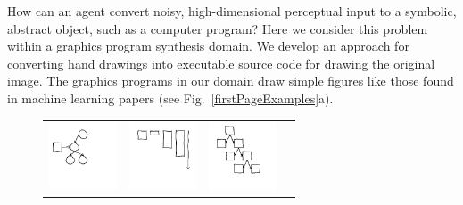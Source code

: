 \documentclass{article}
\newcommand{\exampleImageSize}{2cm}
\begin{document}
 How can an agent convert noisy, high-dimensional perceptual input
 to a symbolic, abstract object, such as a computer program?  Here we
 consider this problem within a graphics program synthesis domain.  We
 develop an approach for converting  hand
 drawings into executable source code for drawing the original image.
 The graphics programs in our domain draw simple figures like those found in
 machine learning papers (see Fig.~\ref{firstPageExamples}a).
 \begin{figure}[H]\vspace{-0.7cm}
  \begin{minipage}[t]{0.7\linewidth}  
\begin{tabular}{llll}
  \includegraphics[width = \exampleImageSize]{figures/expert-60.png}&
  \includegraphics[width = \exampleImageSize]{figures/expert-5.png}&
    \includegraphics[width = \exampleImageSize]{figures/expert-17.png}&

\end{tabular}
\end{minipage}
\end{figure}
\end{document}
